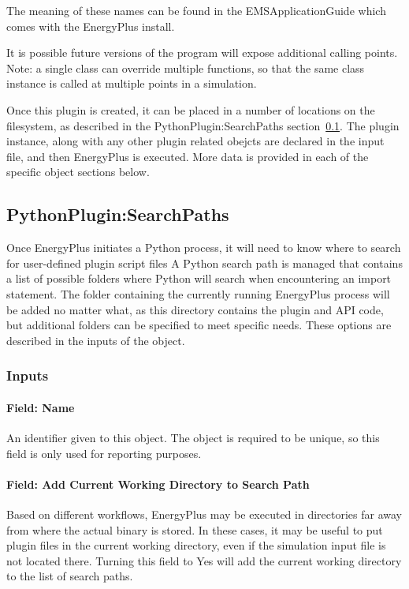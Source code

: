The meaning of these names can be found in the EMSApplicationGuide which comes with the EnergyPlus install.

It is possible future versions of the program will expose additional calling points.
Note: a single class can override multiple functions, so that the same class instance is called at multiple points in a simulation.

Once this plugin is created, it can be placed in a number of locations on the filesystem, as described in the PythonPlugin:SearchPaths section~\ref{subsec:plugin-search-paths}.
The plugin instance, along with any other plugin related obejcts are declared in the input file, and then EnergyPlus is executed.
More data is provided in each of the specific object sections below.

\subsection{PythonPlugin:SearchPaths}\label{subsec:plugin-search-paths}

Once EnergyPlus initiates a Python process, it will need to know where to search for user-defined plugin script files
A Python search path is managed that contains a list of possible folders where Python will search when encountering an import statement.
The folder containing the currently running EnergyPlus process will be added no matter what, as this directory contains the plugin and API code, but additional folders can be specified to meet specific needs.
These options are described in the inputs of the object.

\subsubsection{Inputs}

\paragraph{Field: Name}

An identifier given to this object.
The object is required to be unique, so this field is only used for reporting purposes.

\paragraph{Field: Add Current Working Directory to Search Path}

Based on different workflows, EnergyPlus may be executed in directories far away from where the actual binary is stored.
In these cases, it may be useful to put plugin files in the current working directory, even if the simulation input file is not located there.
Turning this field to Yes will add the current working directory to the list of search paths.

